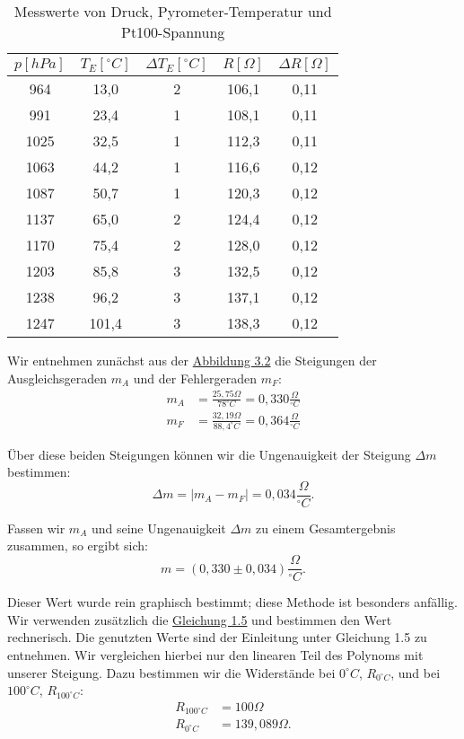 \begin{table}[h!]   
    \centering
    \caption{Messwerte von Druck, Pyrometer-Temperatur und Pt100-Spannung}  
    \label{tab:pt_100}
    \begin{tabular}{c | c | c | c | c}
        \textbf{$p [hPa]$} & \textbf{$T_{E} [^\circ C]$} & \textbf{$\Delta T_{E} [^\circ C]$} & \textbf{$R [\Omega]$} & \textbf{$\Delta R [\Omega]$} \\
        \hline
         964  & 13,0 & 2 & 106,1 & 0,11\\
         991  & 23,4 & 1 & 108,1 & 0,11\\
        1025  & 32,5 & 1 & 112,3 & 0,11\\
        1063  & 44,2 & 1 & 116,6 & 0,12\\
        1087  & 50,7 & 1 & 120,3 & 0,12\\
        1137  & 65,0 & 2 & 124,4 & 0,12\\
        1170  & 75,4 & 2 & 128,0 & 0,12\\
        1203  & 85,8 & 3 & 132,5 & 0,12\\
        1238  & 96,2 & 3 & 137,1 & 0,12\\
        1247  & 101,4 & 3 & 138,3 & 0,12\\
    \end{tabular}
\end{table}

Wir entnehmen zunächst aus der \hyperref[fig:graphisch_temp_widerstand]{Abbildung 3.2} die Steigungen der Ausgleichsgeraden $m_A$ und der Fehlergeraden $m_F$:
\begin{align}
    m_A &= \frac{25,75 \Omega}{78^\circ C} = 0,330 \frac{\Omega}{^\circ C} \\
    m_F &= \frac{32,19 \Omega}{88,4^\circ C} = 0,364 \frac{\Omega}{^\circ C}
\end{align}

Über diese beiden Steigungen können wir die Ungenauigkeit der Steigung $\Delta m$ bestimmen:
\begin{equation}
    \Delta m = \left| m_A - m_F \right| = 0,034 \frac{\Omega}{^\circ C}.
\end{equation}

Fassen wir $m_A$ und seine Ungenauigkeit $\Delta m$ zu einem Gesamtergebnis zusammen, so ergibt sich:
\begin{equation}
   \boxed{m = (0,330 \pm 0,034) \frac{\Omega}{^\circ C}}.
\end{equation}

Dieser Wert wurde rein graphisch bestimmt; diese Methode ist besonders anfällig. Wir verwenden zusätzlich die \hyperref[eq:r_von_t]{Gleichung 1.5} und bestimmen den Wert rechnerisch.
Die genutzten Werte sind der Einleitung unter Gleichung 1.5 zu entnehmen. Wir vergleichen hierbei nur den linearen Teil des Polynoms mit unserer Steigung. Dazu bestimmen wir die Widerstände bei $0^\circ C$, $R_{0^\circ C}$, und bei $100^\circ C$, $R_{100^\circ C}$:
\begin{align}
    R_{100^\circ C} &= 100 \Omega\\
    R_{0^\circ C} &= 139,089 \Omega.
\end{align}

